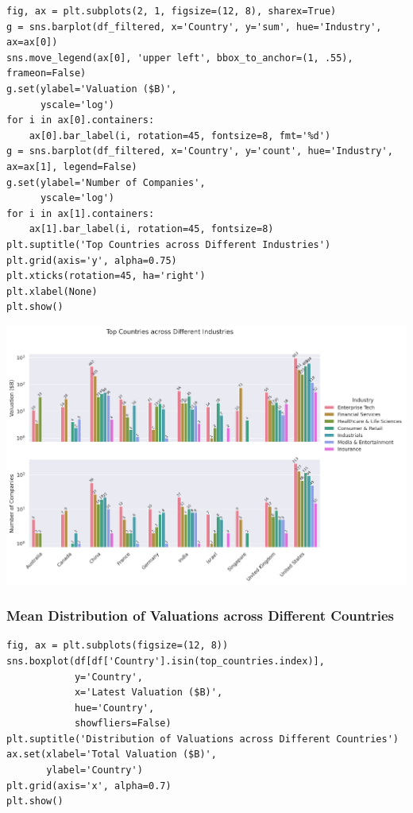 \documentclass[a4paper,12pt]{article}
\begin{document}
\begin{verbatim}
fig, ax = plt.subplots(2, 1, figsize=(12, 8), sharex=True)
g = sns.barplot(df_filtered, x='Country', y='sum', hue='Industry', ax=ax[0])
sns.move_legend(ax[0], 'upper left', bbox_to_anchor=(1, .55), frameon=False)
g.set(ylabel='Valuation ($B)',
      yscale='log')
for i in ax[0].containers:
    ax[0].bar_label(i, rotation=45, fontsize=8, fmt='%d')
g = sns.barplot(df_filtered, x='Country', y='count', hue='Industry', ax=ax[1], legend=False)
g.set(ylabel='Number of Companies',
      yscale='log')
for i in ax[1].containers:
    ax[1].bar_label(i, rotation=45, fontsize=8)
plt.suptitle('Top Countries across Different Industries')
plt.grid(axis='y', alpha=0.75)
plt.xticks(rotation=45, ha='right')
plt.xlabel(None)
plt.show()
\end{verbatim}

\begin{center}
\includegraphics[width=.9\linewidth]{./.ob-jupyter/33900e6d5fea2d6aa2730af6c08c1029c0b26b20.png}
\label{}
\end{center}
\subsubsection{Mean Distribution of Valuations across Different Countries}
\label{sec:org6c8cc6b}

\begin{verbatim}
fig, ax = plt.subplots(figsize=(12, 8))
sns.boxplot(df[df['Country'].isin(top_countries.index)],
            y='Country',
            x='Latest Valuation ($B)',
            hue='Country',
            showfliers=False)
plt.suptitle('Distribution of Valuations across Different Countries')
ax.set(xlabel='Total Valuation ($B)',
       ylabel='Country')
plt.grid(axis='x', alpha=0.7)
plt.show()
\end{verbatim}
\end{document}
